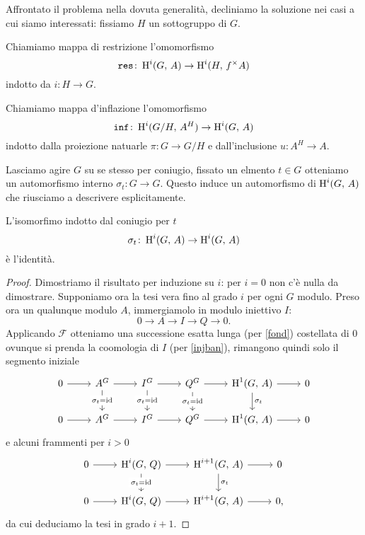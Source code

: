 Affrontato il problema nella dovuta generalità, decliniamo la soluzione nei casi a cui siamo interessati: fissiamo $ H $ un sottogruppo di $ G $.
\begin{definition}[Restrizione]
	Chiamiamo mappa di restrizione l'omomorfismo
	\[ \operatorname{\mathtt{res}} \colon \operatorname{H}^i(G, \, A) \to \operatorname{H}^i(H, \, f^\times A) \]
	indotto da $ i \colon H \to G $.
\end{definition}

\begin{definition}[Inflazione]
	Chiamiamo mappa d'inflazione l'omomorfismo
	\[ \operatorname{\mathtt{inf}} \colon \operatorname{H}^i(G/H, \, A^H) \to \operatorname{H}^i(G, \, A) \]
	indotto dalla proiezione natuarle $ \pi \colon G \to G/H $ e dall'inclusione $ u \colon A^H \to A $.
\end{definition}

Lasciamo agire $ G $ su se stesso per coniugio, fissato un elmento $ t \in G $ otteniamo un automorfismo interno $ \sigma_t \colon G \to G $. Questo induce un automorfismo di $ \operatorname{H}^i(G, \, A) $ che riusciamo a descrivere esplicitamente.

\begin{proposition}\label{coniugio}
	L'isomorfimo indotto dal coniugio per $ t $
	\[ \sigma_t \colon \operatorname{H}^i(G, \, A) \to \operatorname{H}^i(G, \, A) \]
	è l'identità.
\end{proposition}
\begin{proof}
	Dimostriamo il risultato per induzione su $ i $: per $ i = 0 $ non c'è nulla da dimostrare. Supponiamo ora la tesi vera fino al grado $ i $ per ogni $ G $ modulo. Preso ora un qualunque modulo $ A $, immergiamolo in modulo iniettivo $ I $:
	\[ 0 \to A \to I \to Q \to 0. \]
	Applicando $ \mathcal{F} $ otteniamo una successione esatta lunga (per \ref{fond}) costellata di $ 0 $ ovunque si prenda la coomologia di $ I $ (per \ref{injban}), rimangono quindi solo il segmento iniziale
	\[\begin{tikzcd}
	0 \rar & A^G \rar\dar["\sigma_t = \id" description] & I^G \rar\dar["\sigma_t = \id" description] & Q^G \rar\dar["\sigma_t = \id" description] & \HH^1(G, \, A) \rar\dar["\sigma_t"] & 0 \\
	0 \rar & A^G \rar & I^G \rar & Q^G \rar & \HH^1(G, \, A) \rar & 0
	\end{tikzcd}\]
	e alcuni frammenti per $ i > 0 $
	\[\begin{tikzcd}
	0 \rar & \HH^i(G, \, Q) \rar\dar["\sigma_t = \id" description] & \HH^{i+1}(G, \, A) \rar\dar["\sigma_t"] & 0 \\
	0 \rar & \HH^i(G, \, Q) \rar & \HH^{i+1}(G, \, A) \rar & 0,
	\end{tikzcd}\]
	da cui deduciamo la tesi in grado $ i+1 $.
\end{proof}

